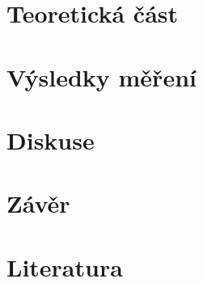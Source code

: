 \documentclass[10pt,a4paper]{article}
\newcommand{\°}{\degree}
\begin{document}
\section{Teoretická část}


\section{Výsledky měření}


\section{Diskuse}


\section{Závěr}



\section{Literatura}
 

 
\end{document}
